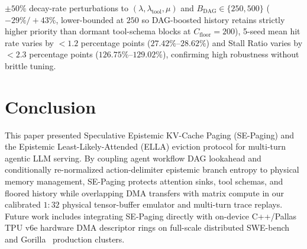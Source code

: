 \documentclass[conference,10pt]{IEEEtran}
\begin{document}
$\pm 50\%$ decay-rate perturbations to $(\lambda, \lambda_{\text{tool}}, \mu)$ and $B_{\text{DAG}} \in \{250, 500\}$ ($-29\% / +43\%$, lower-bounded at $250$ so DAG-boosted history retains strictly higher priority than dormant tool-schema blocks at $C_{\text{floor}} = 200$), 5-seed mean hit rate varies by $< 1.2$ percentage points ($27.42\%\text{--}28.62\%$) and Stall Ratio varies by $< 2.3$ percentage points ($126.75\%\text{--}129.02\%$), confirming high robustness without brittle tuning.

\section{Conclusion}
This paper presented Speculative Epistemic KV-Cache Paging (SE-Paging) and the Epistemic Least-Likely-Attended (ELLA) eviction protocol for multi-turn agentic LLM serving. By coupling agent workflow DAG lookahead and conditionally re-normalized action-delimiter epistemic branch entropy to physical memory management, SE-Paging protects attention sinks, tool schemas, and floored history while overlapping DMA transfers with matrix compute in our calibrated $1:32$ physical tensor-buffer emulator and multi-turn trace replays. Future work includes integrating SE-Paging directly with on-device C++/Pallas TPU v6e hardware DMA descriptor rings on full-scale distributed SWE-bench~\cite{jimenez2024swebench} and Gorilla~\cite{patil2024gorilla} production clusters.
\end{document}
